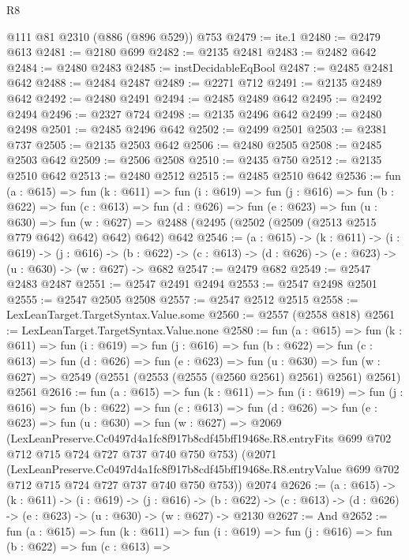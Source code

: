 \begin{lexlean}{R8}
\begin{coremodule}
    @111
    @81
    @2310
    (@886 (@896 @529))
    @753
@2479 := ite.{1}
@2480 := @2479 @613
@2481 := @2180 @699
@2482 := @2135 @2481
@2483 := @2482 @642
@2484 := @2480 @2483
@2485 := instDecidableEqBool
@2487 := @2485 @2481 @642
@2488 := @2484 @2487
@2489 := @2271 @712
@2491 := @2135 @2489 @642
@2492 := @2480 @2491
@2494 := @2485 @2489 @642
@2495 := @2492 @2494
@2496 := @2327 @724
@2498 := @2135 @2496 @642
@2499 := @2480 @2498
@2501 := @2485 @2496 @642
@2502 := @2499 @2501
@2503 := @2381 @737
@2505 := @2135 @2503 @642
@2506 := @2480 @2505
@2508 := @2485 @2503 @642
@2509 := @2506 @2508
@2510 := @2435 @750
@2512 := @2135 @2510 @642
@2513 := @2480 @2512
@2515 := @2485 @2510 @642
@2536 := fun (a : @615) =>
  fun (k : @611) =>
  fun (i : @619) =>
  fun (j : @616) =>
  fun (b : @622) =>
  fun (c : @613) =>
  fun (d : @626) =>
  fun (e : @623) =>
  fun (u : @630) =>
  fun (w : @627) => @2488 (@2495 (@2502 (@2509 (@2513 @2515 @779 @642) @642) @642) @642) @642
@2546 := (a : @615) ->
  (k : @611) ->
  (i : @619) ->
  (j : @616) ->
  (b : @622) -> (c : @613) -> (d : @626) -> (e : @623) -> (u : @630) -> (w : @627) -> @682
@2547 := @2479 @682
@2549 := @2547 @2483 @2487
@2551 := @2547 @2491 @2494
@2553 := @2547 @2498 @2501
@2555 := @2547 @2505 @2508
@2557 := @2547 @2512 @2515
@2558 := LexLeanTarget.TargetSyntax.Value.some
@2560 := @2557 (@2558 @818)
@2561 := LexLeanTarget.TargetSyntax.Value.none
@2580 := fun (a : @615) =>
  fun (k : @611) =>
  fun (i : @619) =>
  fun (j : @616) =>
  fun (b : @622) =>
  fun (c : @613) =>
  fun (d : @626) =>
  fun (e : @623) =>
  fun (u : @630) =>
  fun (w : @627) => @2549 (@2551 (@2553 (@2555 (@2560 @2561) @2561) @2561) @2561) @2561
@2616 := fun (a : @615) =>
  fun (k : @611) =>
  fun (i : @619) =>
  fun (j : @616) =>
  fun (b : @622) =>
  fun (c : @613) =>
  fun (d : @626) =>
  fun (e : @623) =>
  fun (u : @630) =>
  fun (w : @627) =>
  @2069
    (LexLeanPreserve.Cc0497d4a1fc8f917b8cdf45bff19468e.R8.entryFits
      @699
      @702
      @712
      @715
      @724
      @727
      @737
      @740
      @750
      @753)
    (@2071
      (LexLeanPreserve.Cc0497d4a1fc8f917b8cdf45bff19468e.R8.entryValue
        @699
        @702
        @712
        @715
        @724
        @727
        @737
        @740
        @750
        @753))
    @2074
@2626 := (a : @615) ->
  (k : @611) ->
  (i : @619) ->
  (j : @616) ->
  (b : @622) -> (c : @613) -> (d : @626) -> (e : @623) -> (u : @630) -> (w : @627) -> @2130
@2627 := And
@2652 := fun (a : @615) =>
  fun (k : @611) =>
  fun (i : @619) =>
  fun (j : @616) =>
  fun (b : @622) =>
  fun (c : @613) =>

\end{coremodule}
\end{lexlean}
